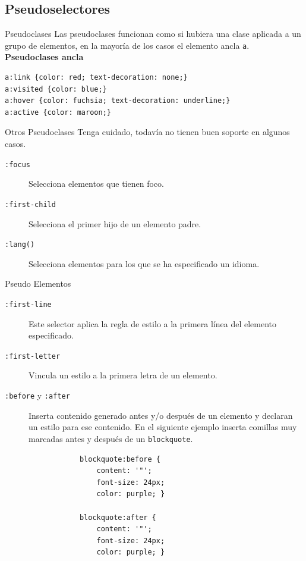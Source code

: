 \subsection{Pseudoselectores} %

\begin{frame}[fragile]{Pseudoclases} %
    Las pseudoclases funcionan como si hubiera una clase aplicada a un grupo de
    elementos, en la mayoría de los casos el elemento ancla \texttt{a}.\\[0.5cm]

    \textbf{Pseudoclases ancla}\\
    \begin{lstlisting}
a:link {color: red; text-decoration: none;}
a:visited {color: blue;}
a:hover {color: fuchsia; text-decoration: underline;}
a:active {color: maroon;}
    \end{lstlisting}
\end{frame}

\begin{frame}{Otros Pseudoclases} %
    Tenga cuidado, todavía no tienen buen soporte en algunos casos. 

    \begin{description}
        \item[\texttt{:focus}] Selecciona elementos que tienen foco. 
        \item[\texttt{:first-child}] Selecciona el primer hijo de un elemento
        padre.
        \item[\texttt{:lang()}] Selecciona elementos para los que se ha
        especificado un idioma.
    \end{description}
\end{frame}

\begin{frame}[fragile]{Pseudo Elementos} %
    \begin{description}
        \item[\texttt{:first-line}] Este selector aplica la regla de estilo a
        la primera línea del elemento especificado. 
        \item[\texttt{:first-letter}] Vincula un estilo a la primera letra de
        un elemento.
        \item[\texttt{:before} y \texttt{:after}] Inserta contenido generado
        antes y/o después de un elemento y declaran un estilo para ese
        contenido. En el siguiente ejemplo inserta comillas muy marcadas antes
        y después de un \texttt{blockquote}.\\
        \begin{lstlisting}
            blockquote:before { 
                content: '"'; 
                font-size: 24px; 
                color: purple; } 
            
            blockquote:after { 
                content: '"'; 
                font-size: 24px; 
                color: purple; } 
        \end{lstlisting}
    \end{description}
\end{frame}

